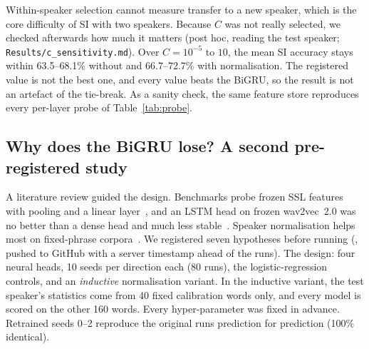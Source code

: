 Within-speaker selection cannot measure transfer to a new speaker, which is the core difficulty of SI with two speakers. Because $C$ was not really selected, we checked afterwards how much it matters (post hoc, reading the test speaker; \texttt{Results/c\_sensitivity.md}). Over $C=10^{-5}$ to $10$, the mean SI accuracy stays within 63.5--68.1\% without and 66.7--72.7\% with normalisation. The registered value is not the best one, and every value beats the BiGRU, so the result is not an artefact of the tie-break.
As a sanity check, the same feature store reproduces every per-layer probe of Table~\ref{tab:probe}.

\subsection{Why does the BiGRU lose? A second pre-registered study}\label{sec:capacity}
A literature review guided the design. Benchmarks probe frozen SSL features with pooling and a linear layer~\cite{superb}, and an LSTM head on frozen wav2vec~2.0 was no better than a dense head and much less stable~\cite{pepino}. Speaker normalisation helps most on fixed-phrase corpora~\cite{pepino}.
We registered seven hypotheses before running (, pushed to GitHub with a server timestamp ahead of the runs).
The design: four neural heads, 10 seeds per direction each (80 runs), the logistic-regression controls, and an \emph{inductive} normalisation variant. In the inductive variant, the test speaker's statistics come from 40 fixed calibration words only, and every model is scored on the other 160 words.
Every hyper-parameter was fixed in advance. Retrained seeds 0--2 reproduce the original runs prediction for prediction (100\% identical).
